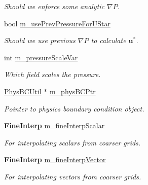 \begin{DoxyCompactItemize}
\begin{DoxyCompactList}\small\item\em Should we enforce some analytic $ \nabla P $. \end{DoxyCompactList}\item 
bool \hyperlink{class_a_m_r_level_mushy_layer_af6dd293bd80f201846fc7d6fe6f851b1}{m\+\_\+use\+Prev\+Pressure\+For\+U\+Star}
\begin{DoxyCompactList}\small\item\em Should we use previous $ \nabla P $ to calculate $ \mathbf{u}^* $. \end{DoxyCompactList}\item 
int \hyperlink{class_a_m_r_level_mushy_layer_a53408b847afbe94238f1f19daf166f2f}{m\+\_\+pressure\+Scale\+Var}
\begin{DoxyCompactList}\small\item\em Which field scales the pressure. \end{DoxyCompactList}\item 
\mbox{\label{class_a_m_r_level_mushy_layer_a556d09747dccd10f54abbf691c058bb5}} 
\hyperlink{class_phys_b_c_util}{Phys\+B\+C\+Util} $\ast$ \hyperlink{class_a_m_r_level_mushy_layer_a556d09747dccd10f54abbf691c058bb5}{m\+\_\+phys\+B\+C\+Ptr}
\begin{DoxyCompactList}\small\item\em Pointer to physics boundary condition object. \end{DoxyCompactList}\item 
\mbox{\label{class_a_m_r_level_mushy_layer_a44fb7624096c8143df1c09e062d57fbf}} 
\textbf{ Fine\+Interp} \hyperlink{class_a_m_r_level_mushy_layer_a44fb7624096c8143df1c09e062d57fbf}{m\+\_\+fine\+Interp\+Scalar}
\begin{DoxyCompactList}\small\item\em For interpolating scalars from coarser grids. \end{DoxyCompactList}\item 
\mbox{\label{class_a_m_r_level_mushy_layer_a9d616c357ecbe1098998feae5ffefa18}} 
\textbf{ Fine\+Interp} \hyperlink{class_a_m_r_level_mushy_layer_a9d616c357ecbe1098998feae5ffefa18}{m\+\_\+fine\+Interp\+Vector}
\begin{DoxyCompactList}\small\item\em For interpolating vectors from coarser grids. \end{DoxyCompactList}\item 

\end{DoxyCompactItemize}

